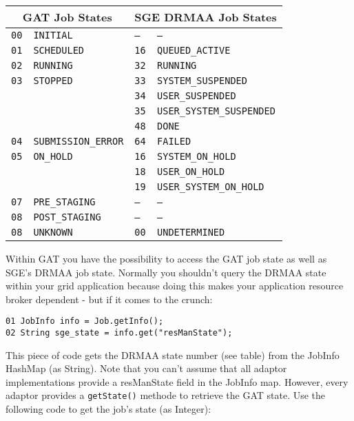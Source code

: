 \documentclass[bibtotocnumbered, headsepline,normalheadings]{scrreprt}
\begin{document}
\begin{center}
\begin{tabular}{|l|l|l|l|} \hline
	\multicolumn{2}{|c|}{GAT Job States}&
	\multicolumn{2}{|c|}{SGE DRMAA Job States}\\ \hline\hline
	\texttt{00} & \texttt{INITIAL}   			& \texttt{--} & \texttt{--}\\ \hline
	\texttt{01} & \texttt{SCHEDULED} 			& \texttt{16} & \texttt{QUEUED\_ACTIVE}\\ \hline
	\texttt{02} & \texttt{RUNNING}   			& \texttt{32} & \texttt{RUNNING}\\ \hline
	\texttt{03} & \texttt{STOPPED}   			& \texttt{33} & \texttt{SYSTEM\_SUSPENDED}\\
	   			&		   						& \texttt{34} & \texttt{USER\_SUSPENDED}\\
	   			&		   						& \texttt{35} & \texttt{USER\_SYSTEM\_SUSPENDED}\\
	   			&		   						& \texttt{48} & \texttt{DONE}\\ \hline
	\texttt{04} & \texttt{SUBMISSION\_ERROR} 	& \texttt{64} & \texttt{FAILED}\\ \hline
	\texttt{05} & \texttt{ON\_HOLD} 			& \texttt{16} & \texttt{SYSTEM\_ON\_HOLD}\\    
	   			&		   						& \texttt{18} & \texttt{USER\_ON\_HOLD}\\
	   			&		   						& \texttt{19} & \texttt{USER\_SYSTEM\_ON\_HOLD}\\ \hline
	\texttt{07} & \texttt{PRE\_STAGING}   		& \texttt{--} & \texttt{--}\\ \hline
	\texttt{08} & \texttt{POST\_STAGING}   		& \texttt{--} & \texttt{--}\\ \hline		   
	\texttt{08} & \texttt{UNKNOWN}   			& \texttt{00} & \texttt{UNDETERMINED}\\ \hline
\end{tabular}
\end{center}

Within GAT you have the possibility to access the GAT job state as well as SGE's DRMAA job state. Normally you shouldn't query the DRMAA state within your grid application because doing this makes your application resource broker dependent - but if it comes to the crunch:

\begin{verbatim}
01 JobInfo info = Job.getInfo();
02 String sge_state = info.get("resManState");
\end{verbatim}

This piece of code gets the DRMAA state number (see table) from the JobInfo HashMap (as String). Note that you can't assume that all adaptor implementations provide a resManState field in the JobInfo map.
However, every adaptor provides a \texttt{getState()} methode to retrieve the GAT state. Use the following code to get the job's state (as Integer):
\end{document}
